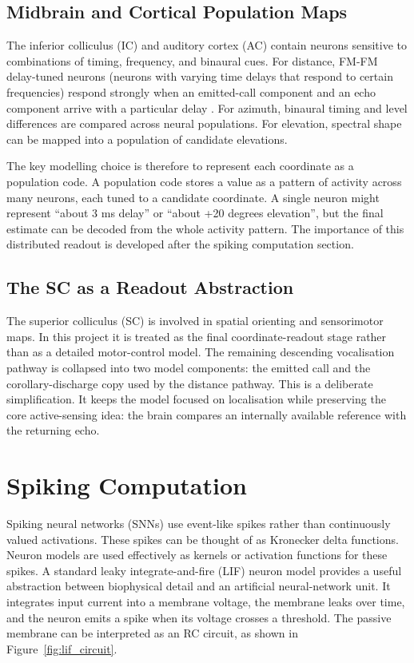 \subsection{Midbrain and Cortical Population Maps}

The inferior colliculus (IC) and auditory cortex (AC) contain neurons sensitive to combinations of timing, frequency, and binaural cues. For distance, FM-FM delay-tuned neurons (neurons with varying time delays that respond to certain frequencies) respond strongly when an emitted-call component and an echo component arrive with a particular delay \cite{Suga2015NeuralBat,Suzuki2017AcuityBats}. For azimuth, binaural timing and level differences are compared across neural populations. For elevation, spectral shape can be mapped into a population of candidate elevations.

The key modelling choice is therefore to represent each coordinate as a population code. A population code stores a value as a pattern of activity across many neurons, each tuned to a candidate coordinate. A single neuron might represent ``about 3 ms delay'' or ``about +20 degrees elevation'', but the final estimate can be decoded from the whole activity pattern. The importance of this distributed readout is developed after the spiking computation section.

\subsection{The SC as a Readout Abstraction}

The superior colliculus (SC) is involved in spatial orienting and sensorimotor maps. In this project it is treated as the final coordinate-readout stage rather than as a detailed motor-control model. The remaining descending vocalisation pathway is collapsed into two model components: the emitted call and the corollary-discharge copy used by the distance pathway. This is a deliberate simplification. It keeps the model focused on localisation while preserving the core active-sensing idea: the brain compares an internally available reference with the returning echo.

\section{Spiking Computation}

Spiking neural networks (SNNs) use event-like spikes rather than continuously valued activations. These spikes can be thought of as Kronecker delta functions. Neuron models are used effectively as kernels or activation functions for these spikes. A standard leaky integrate-and-fire (LIF) neuron model provides a useful abstraction between biophysical detail and an artificial neural-network unit. It integrates input current into a membrane voltage, the membrane leaks over time, and the neuron emits a spike when its voltage crosses a threshold. The passive membrane can be interpreted as an RC circuit, as shown in Figure~\ref{fig:lif_circuit}. 

